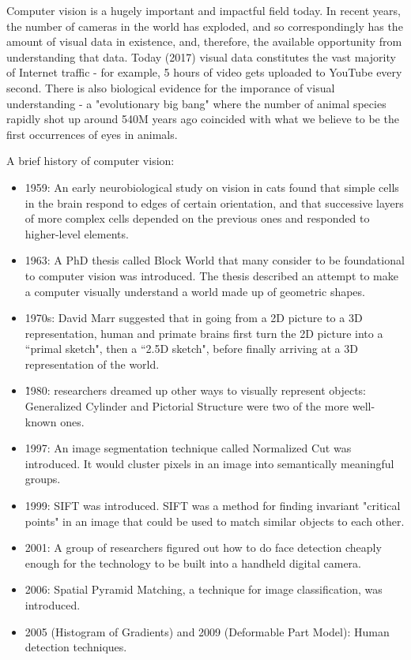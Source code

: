 Computer vision is a hugely important and impactful field today. In recent years, the number of cameras in the world has exploded, and so correspondingly has the amount of visual data in existence, and, therefore, the available opportunity from understanding that data. Today (2017) visual data constitutes the vast majority of Internet traffic - for example, 5 hours of video gets uploaded to YouTube every second. There is also biological evidence for the imporance of visual understanding - a "evolutionary big bang" where the number of animal species rapidly shot up around 540M years ago coincided with what we believe to be the first occurrences of eyes in animals.

A brief history of computer vision:
\begin{itemize}
\item 1959: An early neurobiological study on vision in cats found that simple cells in the brain respond to edges of certain orientation, and that successive layers of more complex cells depended on the previous ones and responded to higher-level elements.
\item 1963: A PhD thesis called Block World that many consider to be foundational to computer vision was introduced. The thesis described an attempt to make a computer visually understand a world made up of geometric shapes.
\item 1970s: David Marr suggested that in going from a 2D picture to a 3D representation, human and primate brains first turn the 2D picture into a ``primal sketch", then a ``2.5D sketch", before finally arriving at a 3D representation of the world.
\item \~1980: researchers dreamed up other ways to visually represent objects: Generalized Cylinder and Pictorial Structure were two of the more well-known ones.
\item 1997: An image segmentation technique called Normalized Cut was introduced. It would cluster pixels in an image into semantically meaningful groups.
\item 1999: SIFT was introduced. SIFT was a method for finding invariant "critical points" in an image that could be used to match similar objects to each other.
\item 2001: A group of researchers figured out how to do face detection cheaply enough for the technology to be built into a handheld digital camera.
\item 2006: Spatial Pyramid Matching, a technique for image classification, was introduced.
\item 2005 (Histogram of Gradients) and 2009 (Deformable Part Model): Human detection techniques.

\end{itemize}
